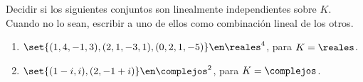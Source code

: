 \begin{enunciado}{\ejercicio}
  Decidir si los siguientes conjuntos son linealmente independientes sobre $K$. Cuando no lo sean,
  escribir a uno de ellos como combinación lineal de los otros.
  \begin{enumerate}[label=\alph*)]
    \item $\set{(1,4,-1,3), (2,1,-3,1),(0,2,1,-5)} \en \reales^4$, para $K = \reales$.
    \item $\set{(1 - i, i), (2,-1 + i)} \en \complejos^2$, para $K = \complejos$.
  \end{enumerate}
\end{enunciado}
